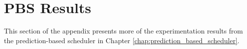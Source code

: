 \chapter{PBS Results}
\label{chap:appendix_pbs_results}

This section of the appendix presents more of the experimentation results from the prediction-based scheduler in Chapter \ref{chap:prediction_based_scheduler}.


